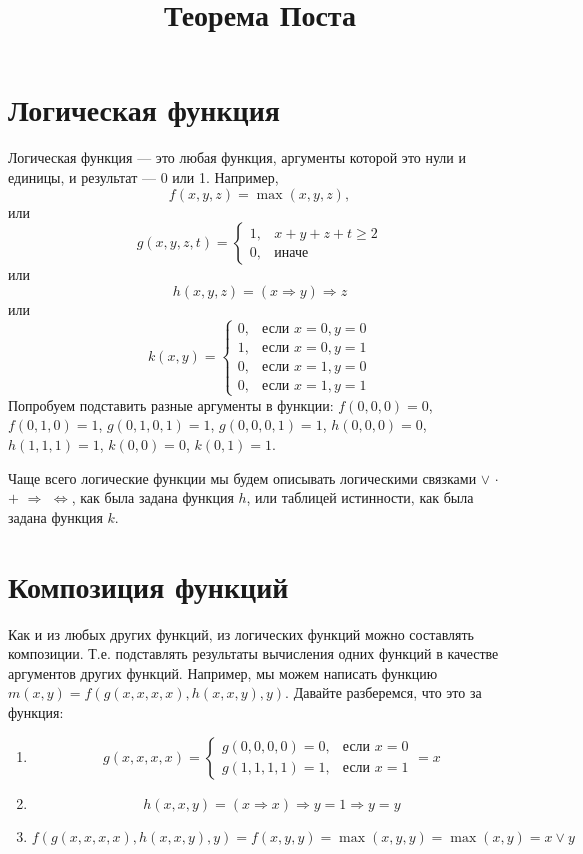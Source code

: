 \documentclass{article}
\title{Теорема Поста}
\author{}
\date{}
\newcommand{\impl}{\Rightarrow}
\renewcommand{\lor}{\vee}
\renewcommand{\land}{\cdot}
\newcommand{\xor}{+}
\newcommand{\eqiv}{\Leftrightarrow}
\begin{document}
    \maketitle

    \section{Логическая функция}
    Логическая функция — это любая функция, аргументы которой это нули и единицы, и результат — 0 или 1.
    Например, \[f(x, y, z) = \max(x, y, z),\] или
    \[g(x, y, z, t) = \begin{cases}
        1, & x + y + z + t \ge 2\\
        0, & \text{иначе}
    \end{cases}\]
    или
    \[h(x, y, z) = (x \impl y) \impl z\]
    или
    \[k(x, y) = \begin{cases}
                    0, & \text{если } x=0, y=0\\
                    1, & \text{если } x=0, y=1\\
                    0, & \text{если } x=1, y=0\\
                    0, & \text{если } x=1, y=1
    \end{cases}\]
    Попробуем подставить разные аргументы в функции: $f(0, 0, 0) = 0$, $f(0, 1, 0) = 1$, $g(0, 1, 0, 1) = 1$,
    $g(0, 0, 0, 1) = 1$, $h(0, 0, 0) = 0$, $h(1, 1, 1) = 1$, $k(0, 0)=0$, $k(0, 1)=1$.

    Чаще всего логические функции мы будем описывать логическими связками $\lor$ $\land$ $\xor$ $\impl$ $\eqiv$, как была задана функция $h$, или таблицей истинности, как была задана функция $k$.

    \section{Композиция функций}
    Как и из любых других функций, из логических функций можно составлять композиции.
    Т.е. подставлять результаты вычисления одних функций в качестве аргументов других функций.
    Например, мы можем написать функцию $m(x, y) = f(g(x, x, x, x), h(x, x, y), y)$.
    Давайте разберемся, что это за функция:
    \begin{enumerate}
        \item \[g(x, x, x, x)=\begin{cases}
                                  g(0, 0, 0, 0)=0, & \text{если } x = 0 \\
                                  g(1, 1, 1, 1)=1, & \text{если } x = 1
        \end{cases} = x\]
        \item \[h(x, x, y)=(x \impl x) \impl y = 1 \impl y = y\]
        \item \[f(g(x, x, x, x), h(x, x, y), y) = f(x, y, y) = \max(x, y, y) = \max(x, y) = x \lor y\]
    \end{enumerate}
\end{document}
